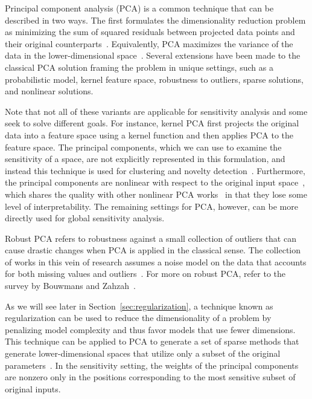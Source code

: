 Principal component analysis (PCA) is a common technique that can be described in two ways.
%
The first formulates the dimensionality reduction problem as minimizing the sum of squared residuals between projected data points and their original counterparts~\cite{Pearson1901}.
%
Equivalently, PCA maximizes the variance of the data in the lower-dimensional space~\cite{Hotelling1933}.
%
Several extensions have been made to the classical PCA solution framing the problem in unique settings, such as a probabilistic model, kernel feature space, robustness to outliers, sparse solutions, and nonlinear solutions.

Note that not all of these variants are applicable for sensitivity analysis and some seek to solve different goals.
%
For instance, kernel PCA first projects the original data into a feature space using a kernel function and then applies PCA to the feature space.
%
The principal components, which we can use to examine the sensitivity of a space, are not explicitly represented in this formulation, and instead this technique is used for clustering and novelty detection~\cite{ScholkopfSmolaMuller1997}.
%
Furthermore, the principal components are nonlinear with respect to the original input space~\cite{BishopNasrabadi2006}, which shares the quality with other nonlinear PCA works~\cite{CollinsDasguptaSchapire2001,MohamedGhahramaniHeller2009,HyvarinenKarhunenOja2001} in that they lose some level of interpretability.
%
The remaining settings for PCA, however, can be more directly used for global sensitivity analysis.

Robust PCA refers to robustness against a small collection of outliers that can cause drastic changes when PCA is applied in the classical sense.
%
The collection of works in this vein of research assumes a noise model on the data that accounts for both missing values and outliers~\cite{CandesLiMa2011,Choulakian2006,GalpinHawkins1987}.
%
For more on robust PCA, refer to the survey by Bouwmans and Zahzah~\cite{BouwmansZahzah2014}.

As we will see later in Section~\ref{sec:regularization}, a technique known as regularization can be used to reduce the dimensionality of a problem by penalizing model complexity and thus favor models that use fewer dimensions.
%
This technique can be applied to PCA to generate a set of sparse methods that generate lower-dimensional spaces that utilize only a subset of the original parameters~\cite{dAspremontBachGhaoui2008,dAspremontGhaouiJordan2007,JourneeNesterovRichtarik2010,ZouHastieTibshirani2006}.
%
In the sensitivity setting, the weights of the principal components are nonzero only in the positions corresponding to the most sensitive subset of original inputs.

